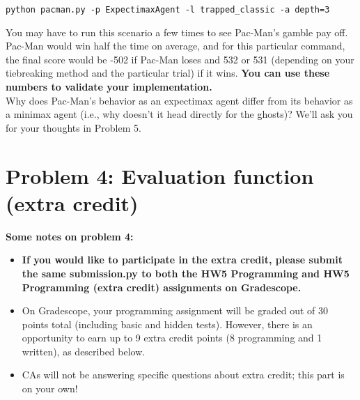 \documentclass{article}
\theoremstyle{case}
\theoremstyle{definition}
\begin{document}
\begin{enumerate}
    \texttt{python pacman.py -p ExpectimaxAgent -l trapped_classic -a depth=3}

     You may have to run this scenario a few times to see Pac-Man's gamble pay off. Pac-Man would win half the time on average, and for this particular command, the final score would be -502 if Pac-Man loses and 532 or 531 (depending on your tiebreaking method and the particular trial) if it wins. \textbf{You can use these numbers to validate your implementation.}\\

     Why does Pac-Man's behavior as an expectimax agent differ from its behavior as a minimax agent (i.e., why doesn't it head directly for the ghosts)? We'll ask you for your thoughts in Problem 5.
\end{enumerate}

\newpage
\section*{Problem 4: Evaluation function (extra credit)}
  \textbf{Some notes on problem 4:}
  \begin{itemize}
      \item \textbf{If you would like to participate in the extra credit, please submit the same submission.py to both the HW5 Programming and HW5 Programming (extra credit) assignments on Gradescope.}
      \item On Gradescope, your programming assignment will be graded out of 30 points total (including basic and hidden tests). However, there is an opportunity to earn up to 9 extra credit points (8 programming and 1 written), as described below.
      \item CAs will not be answering specific questions about extra credit; this part is on your own!
  \end{itemize}
\end{document}
